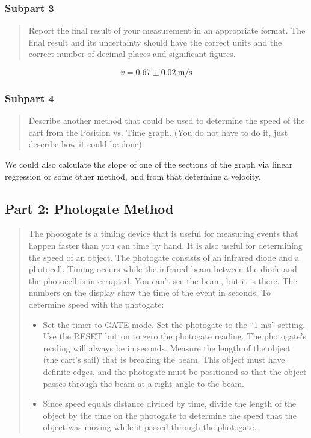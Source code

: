 \documentclass[8pt]{extarticle}
\newcommand{\plain}[1]{\textrm{#1}}
\begin{document}
{\subsubsection*{Subpart 3}
\begin{quote}
	Report the final result of your measurement in an appropriate format.  The final result and its uncertainty should have the correct units and the correct number of decimal places and significant figures.
\end{quote}
\[ v = 0.67\pm 0.02~\plain{m/s} \]
\subsubsection*{Subpart 4}
\begin{quote}
	Describe another method that could be used to determine the speed of the cart from the Position vs. Time graph. (You do not have to do it, just describe how it could be done).
\end{quote}
We could also calculate the slope of one of the sections of the graph via linear regression or some other method, and from that determine a velocity.
\subsection*{Part 2: Photogate Method}
\begin{quote}
	The photogate is a timing device that is useful for measuring events that happen faster than you can time by hand. It is also useful for determining the speed of an object. The photogate consists of an infrared diode and a photocell. Timing occurs while the infrared beam between the diode and the photocell is interrupted. You can’t see the beam, but it is there. The numbers on the display show the time of the event in seconds.
	To determine speed with the photogate:
	\begin{itemize}
		\item Set the timer to GATE mode. Set the photogate to the “1 ms” setting. Use the RESET button to zero the photogate reading. The photogate’s reading will always be in seconds. Measure the length of the object (the cart’s sail) that is breaking the beam. This object must have definite edges, and the photogate must be positioned so that the object passes through the beam at a right angle to the beam.
		\item Since speed equals distance divided by time, divide the length of the object by the time on the photogate to determine the speed that the object was moving while it passed through the photogate.
	\end{itemize}
\end{quote}
}
\end{document}
